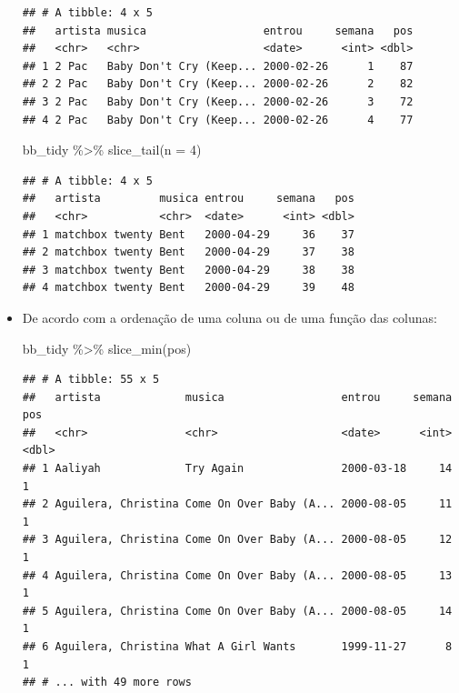 \documentclass[
  11pt]{report}
\newenvironment{Shaded}{\begin{snugshade}}{\end{snugshade}}
\newcommand{\AttributeTok}[1]{\textcolor[rgb]{0.77,0.63,0.00}{#1}}
\newcommand{\DecValTok}[1]{\textcolor[rgb]{0.00,0.00,0.81}{#1}}
\newcommand{\FunctionTok}[1]{\textcolor[rgb]{0.00,0.00,0.00}{#1}}
\newcommand{\NormalTok}[1]{#1}
\newcommand{\SpecialCharTok}[1]{\textcolor[rgb]{0.00,0.00,0.00}{#1}}
\renewenvironment{Shaded}{
    \begin{mdframed}[%
      roundcorner=2pt,%
      innerleftmargin=5pt,%
      innerrightmargin=5pt,%
      topline=true,%
      leftline=true,%
      rightline=true,%
      bottomline=true,%
      linewidth=0.5pt,%
      linecolor=black!20,%
      backgroundcolor=black!2,%
      skipabove=2ex,%
      skipbelow=2.5ex%
    ]%
  }
  {
    \end{mdframed}
  }
\begin{document}
\begin{itemize}
\begin{verbatim}
## # A tibble: 4 x 5
##   artista musica                  entrou     semana   pos
##   <chr>   <chr>                   <date>      <int> <dbl>
## 1 2 Pac   Baby Don't Cry (Keep... 2000-02-26      1    87
## 2 2 Pac   Baby Don't Cry (Keep... 2000-02-26      2    82
## 3 2 Pac   Baby Don't Cry (Keep... 2000-02-26      3    72
## 4 2 Pac   Baby Don't Cry (Keep... 2000-02-26      4    77
\end{verbatim}

\begin{Shaded}
\begin{Highlighting}[]
\NormalTok{bb\_tidy }\SpecialCharTok{\%\textgreater{}\%} 
  \FunctionTok{slice\_tail}\NormalTok{(}\AttributeTok{n =} \DecValTok{4}\NormalTok{)}
\end{Highlighting}
\end{Shaded}

\begin{verbatim}
## # A tibble: 4 x 5
##   artista         musica entrou     semana   pos
##   <chr>           <chr>  <date>      <int> <dbl>
## 1 matchbox twenty Bent   2000-04-29     36    37
## 2 matchbox twenty Bent   2000-04-29     37    38
## 3 matchbox twenty Bent   2000-04-29     38    38
## 4 matchbox twenty Bent   2000-04-29     39    48
\end{verbatim}
\item
  De acordo com a ordenação de uma coluna ou de uma função das colunas:

\begin{Shaded}
\begin{Highlighting}[]
\NormalTok{bb\_tidy }\SpecialCharTok{\%\textgreater{}\%} 
  \FunctionTok{slice\_min}\NormalTok{(pos)}
\end{Highlighting}
\end{Shaded}

\begin{verbatim}
## # A tibble: 55 x 5
##   artista             musica                  entrou     semana   pos
##   <chr>               <chr>                   <date>      <int> <dbl>
## 1 Aaliyah             Try Again               2000-03-18     14     1
## 2 Aguilera, Christina Come On Over Baby (A... 2000-08-05     11     1
## 3 Aguilera, Christina Come On Over Baby (A... 2000-08-05     12     1
## 4 Aguilera, Christina Come On Over Baby (A... 2000-08-05     13     1
## 5 Aguilera, Christina Come On Over Baby (A... 2000-08-05     14     1
## 6 Aguilera, Christina What A Girl Wants       1999-11-27      8     1
## # ... with 49 more rows
\end{verbatim}


\end{itemize}
\end{document}
